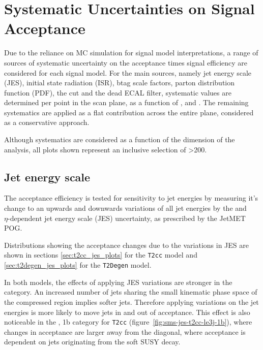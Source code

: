 \section{Systematic Uncertainties on Signal Acceptance }  %
\label{sec:interpretation_uncertainties}

Due to the reliance on MC simulation for signal model interpretations, a range
of sources of systematic uncertainty on the acceptance times signal efficiency
are considered for each signal 
model. For the main sources, namely jet energy scale (JES), initial state 
radiation (ISR), btag scale factors, parton distribution function (PDF), the 
\mhtmet cut and the dead ECAL filter, systematic values are determined per point
in the scan plane, as a function of \HT, \nb and \nj. The remaining systematics 
are applied as a flat contribution across the entire plane, considered as a 
conservative approach.

Although systematics are considered as a function of the \HT dimension of the 
analysis, all plots shown represent an inclusive selection of \HT>200\gev.

\subsection{Jet energy scale}
The acceptance efficiency is tested for sensitivity to jet energies by measuring
it's change to an upwards and downwards variations of all jet energies by the 
\Pt and $\eta\text{-dependent}$ jet energy scale (JES) uncertainty, as prescribed by 
the JetMET POG.

Distributions showing the acceptance changes due to the variations in JES are 
shown in sections \ref{sec:t2cc_jes_plots} for the \texttt{T2cc} model and
\ref{sec:t2degen_jes_plots} for the \texttt{T2Degen} model.

In both models, the effects of applying 
JES variations are stronger in the \njhigh category. An increased number of jets
sharing the small kinematic phase space of the compressed region implies softer jets.
Therefore applying
variations on the jet energies is more likely to move jets in and out of 
acceptance. This effect is also noticeable in the \njlow, 1b category for 
\texttt{T2cc} (figure~\ref{fig:sms-jes-t2cc-le3j-1b}), where changes in acceptance
are larger away from the diagonal, 
where acceptance is dependent on jets originating from the soft SUSY decay.


